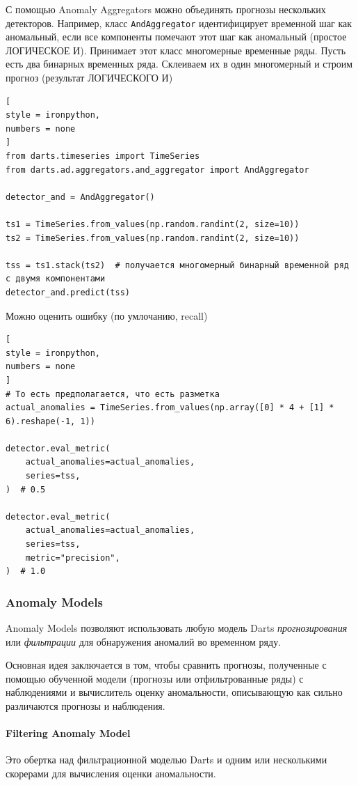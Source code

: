 \documentclass[%
	11pt,
	a4paper,
	utf8,
		]{article}
\begin{document}
С помощью Anomaly Aggregators можно объединять прогнозы нескольких детекторов. Например, класс \verb|AndAggregator| идентифицирует временной шаг как аномальный, если все компоненты помечают этот шаг как аномальный (простое ЛОГИЧЕСКОЕ И). Принимает этот класс многомерные временные ряды. Пусть есть два бинарных временных ряда. Склеиваем их в один многомерный и строим прогноз (результат ЛОГИЧЕСКОГО И)
\begin{lstlisting}[
style = ironpython,
numbers = none
]
from darts.timeseries import TimeSeries
from darts.ad.aggregators.and_aggregator import AndAggregator

detector_and = AndAggregator()

ts1 = TimeSeries.from_values(np.random.randint(2, size=10))
ts2 = TimeSeries.from_values(np.random.randint(2, size=10))

tss = ts1.stack(ts2)  # получается многомерный бинарный временной ряд с двумя компонентами
detector_and.predict(tss)
\end{lstlisting}

Можно оценить ошибку (по умлочанию, recall)
\begin{lstlisting}[
style = ironpython,
numbers = none
]
# То есть предполагается, что есть разметка
actual_anomalies = TimeSeries.from_values(np.array([0] * 4 + [1] * 6).reshape(-1, 1))

detector.eval_metric(
	actual_anomalies=actual_anomalies,
	series=tss,
)  # 0.5

detector.eval_metric(
    actual_anomalies=actual_anomalies,
    series=tss,
    metric="precision",
)  # 1.0
\end{lstlisting}

\subsubsection{Anomaly Models}

Anomaly Models позволяют использовать любую модель Darts \emph{прогнозирования} или \emph{фильтрации} для обнаружения аномалий во временном ряду.

Основная идея заключается в том, чтобы сравнить прогнозы, полученные с помощью обученной модели (прогнозы или отфильтрованные ряды) с наблюдениями и вычислитель оценку аномальности, описывающую как сильно различаются прогнозы и наблюдения.

\paragraph{Filtering Anomaly Model} Это обертка над фильтрационной моделью Darts и одним или несколькими скорерами для вычисления оценки аномальности.
\end{document}
